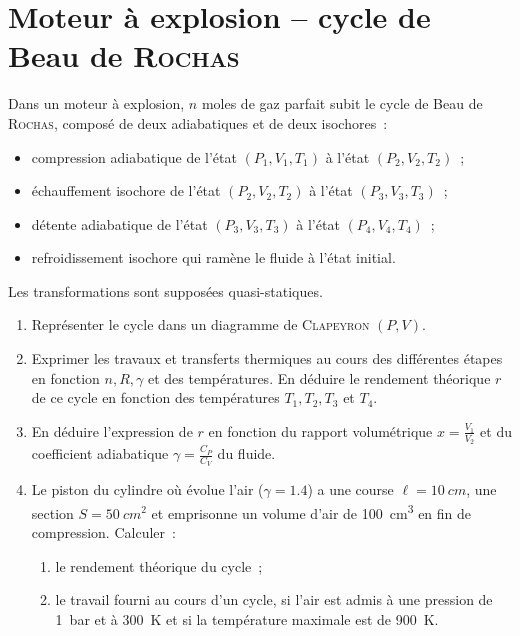 \documentclass[a4paper, 10pt, final, garamond]{book}
\begin{document}
\section{Moteur à explosion -- cycle de Beau de \textsc{Rochas}}
Dans un moteur à explosion, $n$ moles de gaz parfait subit le cycle de Beau de
\textsc{Rochas}, composé de deux adiabatiques et de deux isochores~:
\begin{itemize}
  \item compression adiabatique de l'état $(P_1,V_1,T_1)$ à l'état
    $(P_2,V_2,T_2)$~;
  \item échauffement isochore de l'état $(P_2,V_2,T_2)$ à l'état
    $(P_3,V_3,T_3)$~;
  \item détente adiabatique de l'état $(P_3,V_3,T_3)$ à l'état $(P_4,V_4,T_4)$~;
  \item refroidissement isochore qui ramène le fluide à l'état initial.
\end{itemize}
Les transformations sont supposées quasi-statiques.
\begin{enumerate}
  \item Représenter le cycle dans un diagramme de \textsc{Clapeyron} $(P,V)$.
  \item Exprimer les travaux et transferts thermiques au cours des différentes
    étapes en fonction $n,R,\gamma$ et des températures. En déduire le
    rendement théorique $r$ de ce cycle en fonction des températures
    $T_1,T_2,T_3$ et $T_4$.
  \item En déduire l'expression de $r$ en fonction du rapport volumétrique $x =
    \frac{V_1}{V_2}$ et du coefficient adiabatique $\gamma = \frac{C_P}{C_V}$ du
    fluide.
  \item Le piston du cylindre où évolue l'air ($\gamma = \num{1.4}$) a une
    course $\ell = \SI{10}{cm}$, une section $S = \SI{50}{cm^2}$ et emprisonne
    un volume d'air de \SI{100}{cm^3} en fin de compression. Calculer~:
    \begin{enumerate}
      \item le rendement théorique du cycle~;
      \item le travail fourni au cours d'un cycle, si l'air est admis à une
        pression de \SI{1}{bar} et à \SI{300}{K} et si la température maximale
        est de \SI{900}{K}.
    \end{enumerate}
\end{enumerate}
\end{document}
